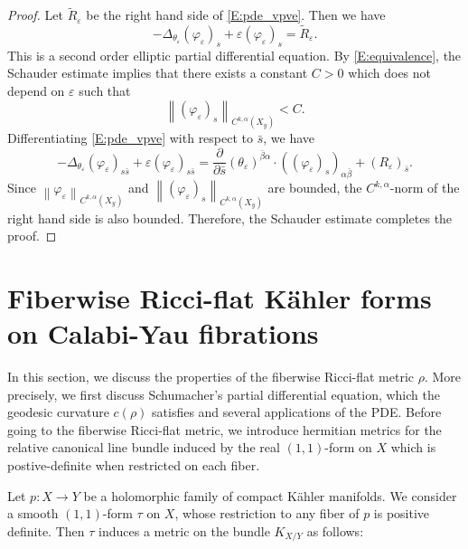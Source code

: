 \documentclass{amsart}
\theoremstyle{definition}
\numberwithin{equation}{section}
\begin{document}
\begin{proof}
Let $\tilde R_{\varepsilon}$ be the right hand side of \eqref{E:pde_vpve}. Then we have
\begin{equation*}
-\Delta_{\theta_{\varepsilon}}({\varphi}_{\varepsilon})_s
+
{\varepsilon}({\varphi}_{\varepsilon})_s
=
\tilde R_{\varepsilon}.
\end{equation*}
This is a second order elliptic partial differential equation. By \eqref{E:equivalence}, the Schauder estimate implies that there exists a constant $C>0$ which does not depend on ${\varepsilon}$ such that
\begin{equation*}
{\left\|{({\varphi}_{\varepsilon})_s}\right\|}_{C^{k,\alpha}(X_y)}
<
C.
\end{equation*}
Differentiating \eqref{E:pde_vpve} with respect to $\bar s$, we have
\begin{equation*}
-\Delta_{\theta_{\varepsilon}}({\varphi}_{\varepsilon})_{s\bar s}
+
{\varepsilon}({\varphi}_{\varepsilon})_{s\bar s}
=
{\frac{\partial{}}{\partial{\bar s}}}(\theta_{\varepsilon})^{\bar\beta\alpha}\cdot(({\varphi}_{\varepsilon})_s)_{\alpha\bar\beta}
+
(R_{\varepsilon})_{\bar s}.
\end{equation*}
Since ${\left\|{{\varphi}_{\varepsilon}}\right\|}_{C^{k,\alpha}(X_y)}$ and ${\left\|{({\varphi}_{\varepsilon})_s}\right\|}_{C^{k,\alpha}(X_y)}$ are bounded, the $C^{k,\alpha}$-norm of the right hand side is also bounded.
Therefore, the Schauder estimate completes the proof.
\end{proof}

\section{Fiberwise Ricci-flat K\"ahler forms on Calabi-Yau fibrations}\label{S:fiberwiseRFf}

In this section, we discuss the properties of the fiberwise Ricci-flat metric $\rho$. More precisely, we first discuss Schumacher's partial differential equation, which the geodesic curvature $c(\rho)$ satisfies and several applications of the PDE. Before going to the fiberwise Ricci-flat metric, we introduce hermitian metrics for the relative canonical line bundle induced by the real $(1,1)$-form on $X$ which is postive-definite when restricted on each fiber.

Let $p:X\rightarrow Y$ be a holomorphic family of compact K\"ahler manifolds. We consider a smooth $(1,1)$-form $\tau$ on $X$, whose restriction to any fiber of $p$ is positive definite. Then $\tau$ induces a metric on the bundle $K_{X/Y}$ as follows:
\end{document}
